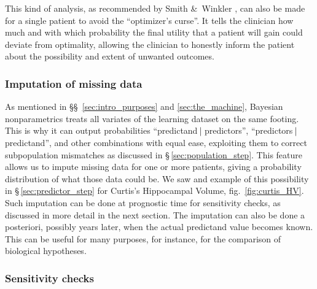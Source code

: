 \documentclass[a4paper,12pt,%
onecolumn,oneside,article,%
british%
]{memoir}
\theoremstyle{remark}
\theoremstyle{innote}
\newcommand*{\amp}{\&}
\renewcommand*{\|}[1][]{\nonscript\:#1\vert\nonscript\:\mathopen{}}
\newcommand*{\sect}{\S}%
\newcommand*{\sects}{\S\S}%
\newcommand*{\fig}{fig.}%
\begin{document}
This kind of analysis, as recommended by Smith \amp\ Winkler \autocites{smithetal2006}, can also be made for a single patient to avoid the \enquote{optimizer's curse}. It tells the clinician how much and with which probability the final utility that a patient will gain could deviate from optimality, allowing the clinician to honestly inform the patient about the possibility and extent of unwanted outcomes.

\subsubsection{Imputation of missing data}
\label{sec:missing_data}

As mentioned in \sects~\ref{sec:intro_purposes} and \ref{sec:the_machine}, Bayesian nonparametrics treats all variates of the learning dataset on the same footing. This is why it can output probabilities \enquote{predictand$\|$predictors}, \enquote{predictors$\|$predictand}, and other combinations with equal ease, exploiting them to correct subpopulation mismatches as discussed in \sect\,\ref{sec:population_step}. This feature allows us to impute missing data for one or more patients, giving a probability distribution of what those data could be. We saw and example of this possibility in \sect\,\ref{sec:predictor_step} for Curtis's Hippocampal Volume, \fig~\ref{fig:curtis_HV}. Such imputation can be done at prognostic time for sensitivity checks, as discussed in more detail in the next section. The imputation can also be done a posteriori, possibly years later, when the actual predictand value becomes known. This can be useful for many purposes, for instance, for the comparison of biological hypotheses.


\subsubsection{Sensitivity checks}
\label{sec:sensitivity}
\end{document}
